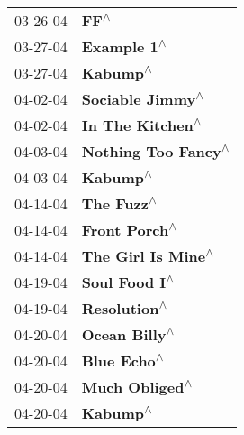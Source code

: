\begin{supertabular}{p{0.25\columnwidth}p{0.75\columnwidth}}
 03-26-04 &                                                                       \textbf{FF\textsuperscript{$\wedge$}} \\
 03-27-04 &                                                                \textbf{Example 1\textsuperscript{$\wedge$}} \\
 03-27-04 &                                                                   \textbf{Kabump\textsuperscript{$\wedge$}} \\
 04-02-04 &                                                           \textbf{Sociable Jimmy\textsuperscript{$\wedge$}} \\
 04-02-04 &                                                           \textbf{In The Kitchen\textsuperscript{$\wedge$}} \\
 04-03-04 &                                                        \textbf{Nothing Too Fancy\textsuperscript{$\wedge$}} \\
 04-03-04 &                                                                   \textbf{Kabump\textsuperscript{$\wedge$}} \\
 04-14-04 &                                                                 \textbf{The Fuzz\textsuperscript{$\wedge$}} \\
 04-14-04 &                                                              \textbf{Front Porch\textsuperscript{$\wedge$}} \\
 04-14-04 &                                                         \textbf{The Girl Is Mine\textsuperscript{$\wedge$}} \\
 04-19-04 &                                                              \textbf{Soul Food I\textsuperscript{$\wedge$}} \\
 04-19-04 &                                                               \textbf{Resolution\textsuperscript{$\wedge$}} \\
 04-20-04 &                                                              \textbf{Ocean Billy\textsuperscript{$\wedge$}} \\
 04-20-04 &                                                                \textbf{Blue Echo\textsuperscript{$\wedge$}} \\
 04-20-04 &                                                             \textbf{Much Obliged\textsuperscript{$\wedge$}} \\
 04-20-04 &                                                                   \textbf{Kabump\textsuperscript{$\wedge$}} \\

\end{supertabular}
